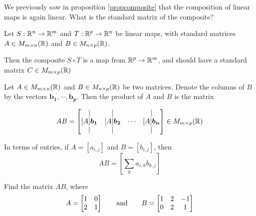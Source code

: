 


\begin{motivating}
We previously saw in proposition \ref{propcomposite} that the composition of linear maps is again linear.  What is the standard matrix of the composite?
\end{motivating}

Let $S: \mathbb{R}^n \to \mathbb{R}^m$ and $T : \mathbb{R}^p \to \mathbb{R}^n$ be linear maps, with standard matrices $A \in M_{m \times n}(\mathbb{R})$ and $B \in M_{n \times p}(\mathbb{R})$.

Then the composite $S \circ T$ is a map from $\mathbb{R}^p \to \mathbb{R}^m$, and should have a standard matrix $C \in M_{m \times p}(\mathbb{R})$

\begin{definition}
    
    Let $A \in M_{m \times n}(\mathbb{R})$ and $B \in M_{n \times p}(\mathbb{R})$ be two matrices.  Denote the columns of $B$ by the vectors $\bm{b_1}, \cdots, \bm{b_p}$.  Then the product of $A$ and $B$ is the matrix
    
    \begin{equation*}
AB = 
\begin{bmatrix}
\vert & \vert & & \vert \\
    [A]\bm{b_1}   & [A]\bm{b_2} & \cdots & [A]\bm{b_n}  \\
    \vert & \vert & & \vert
\end{bmatrix} \in M_{m \times p}(\mathbb{R})
\end{equation*}
    
    
    In terms of entries, if $A = [a_{i,j}]$ and $B = [b_{i,j}]$, then $$AB = \left[\sum_k a_{i,k}b_{k,j}\right]$$
    

    
\end{definition}


\begin{example}
    Find the matrix $AB$, where \begin{equation*}
A = 
\begin{bmatrix}
1 & 0 \\
2 & 1
\end{bmatrix} \qquad \textnormal{and} \qquad B = 
\begin{bmatrix}
1 & 2 & -1 \\
0 & 2 & 1
\end{bmatrix}
\end{equation*}
\end{example}


